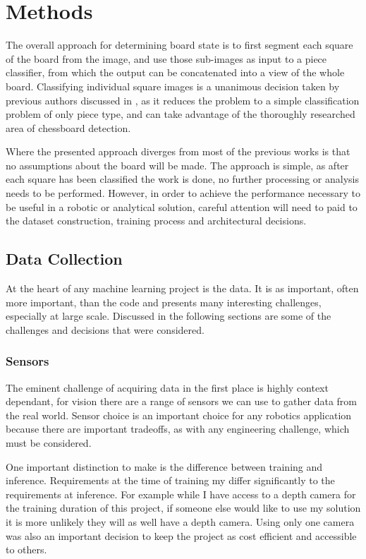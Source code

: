 \chapter{Methods}
\label{methods}

The overall approach for determining board state is to first segment each square of the board from the image,
and use those sub-images as input to a piece classifier, from which the output can be concatenated into a view of the whole board.
Classifying individual square images is a unanimous decision taken by previous authors discussed in ,
as it reduces the problem to a simple classification problem of only piece type, and can take advantage of the thoroughly researched area 
of chessboard detection.

Where the presented approach diverges from most of the previous works is that no assumptions about the board will be made. 
The approach is simple, as after each square has been classified the work is done, no further processing or analysis needs to be performed.
However, in order to achieve the performance necessary to be useful in a robotic or analytical solution, careful attention will need to 
paid to the dataset construction, training process and architectural decisions.

\section{Data Collection}
\label{data collection}
At the heart of any machine learning project is the data.  
It is as important, often more important, than the code and presents many interesting challenges, especially at large scale.
Discussed in the following sections are some of the challenges and decisions that were considered.

\subsection{Sensors}
The eminent challenge of acquiring data in the first place is highly context dependant,
for vision there are a range of sensors we can use to gather data from the real world.
Sensor choice is an important choice for any robotics application because there are 
important tradeoffs, as with any engineering challenge, which must be considered.

One important distinction to make is the difference between training and inference.
Requirements at the time of training my differ significantly to the requirements at 
inference.  For example while I have access to a depth camera for the training duration 
of this project, if someone else would like to use my solution it is more unlikely they 
will as well have a depth camera.
Using only one camera was also an important decision to keep the project as cost efficient and 
accessible to others.

